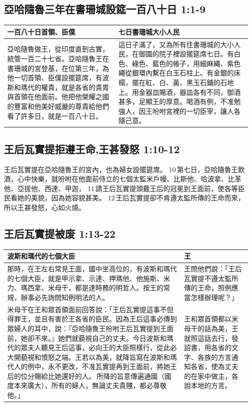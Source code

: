 \subsection{亞哈隨魯三年在書珊城設筵一百八十日 1:1-9}
\begin{table}[H]
  \centering 
    \begin{tabular}{p{}|p{}}    \toprule
一百八十日首領、臣僕&七日書珊城大小人民\\    \midrule
亞哈隨魯做王，從印度直到古實，統管一百二十七省。亞哈隨魯王在書珊城的宮登基，在位第三年，為他一切首領、臣僕設擺筵席，有波斯和瑪代的權貴，就是各省的貴胄與首領在他面前。他把他榮耀之國的豐富和他美好威嚴的尊貴給他們看了許多日，就是一百八十日。
&這日子滿了，又為所有住書珊城的大小人民，在御園的院子裡設擺筵席七日。有白色、綠色、藍色的帳子，用細麻繩、紫色繩從銀環內繫在白玉石柱上。有金銀的床榻，擺在紅、白、黃、黑玉石鋪的石地上。用金器皿賜酒，器皿各有不同，御酒甚多，足顯王的厚意。喝酒有例，不准勉強人，因王吩咐宮裡的一切臣宰，讓人各隨己意。\\     \bottomrule
    \end{tabular} 
\end{table} 


\subsection{王后瓦實提拒遵王命,王甚發怒 1:10-12}
王后瓦實提在亞哈隨魯王的宮內，也為婦女設擺筵席。 10 第七日，亞哈隨魯王飲酒，心中快樂，就吩咐在他面前侍立的七個太監米戶幔、比斯他、哈波拿、比革他、亞拔他、西達、甲迦， 11 請王后瓦實提頭戴王后的冠冕到王面前，使各等臣民看她的美貌，因為她容貌甚美。 12 王后瓦實提卻不肯遵太監所傳的王命而來，所以王甚發怒，心如火燒。

\subsection{王后瓦實提被废 1:13-22}
\begin{table}[H]
\centering 
\begin{tabular}{p{}|p{}}    \toprule
波斯和瑪代的七個大臣&王\\  \midrule
那時，在王左右常見王面，國中坐高位的，有波斯和瑪代的七個大臣，就是甲示拿、示達、押瑪他、他施斯、米力、瑪西拿、米母干，都是達時務的明哲人。按王的常規，辦事必先詢問知例明法的人。
&王問他們說：「王后瓦實提不遵太監所傳的王命，照例應當怎樣辦理呢？」\\\midrule    
米母干在王和眾首領面前回答說：「王后瓦實提這事不但得罪王，並且有害於王各省的臣民。因為王后這事必傳到眾婦人的耳中，說：『亞哈隨魯王吩咐王后瓦實提到王面前，她卻不來。』她們就藐視自己的丈夫。今日波斯和瑪代的眾夫人聽見王后這事，必向王的大臣照樣行，從此必大開藐視和憤怒之端。王若以為美，就降旨寫在波斯和瑪代人的例中，永不更改，不准瓦實提再到王面前，將她王后的位分賜給比她還好的人。 所降的旨意傳遍通國（國度本來廣大），所有的婦人，無論丈夫貴賤，都必尊敬他。」&王和眾首領都以米母干的話為美，王就照這話去行，發詔書，用各省的文字、各族的方言通知各省，使為丈夫的在家中做主，各說本地的方言。\\\bottomrule
\end{tabular} 
\end{table} 


